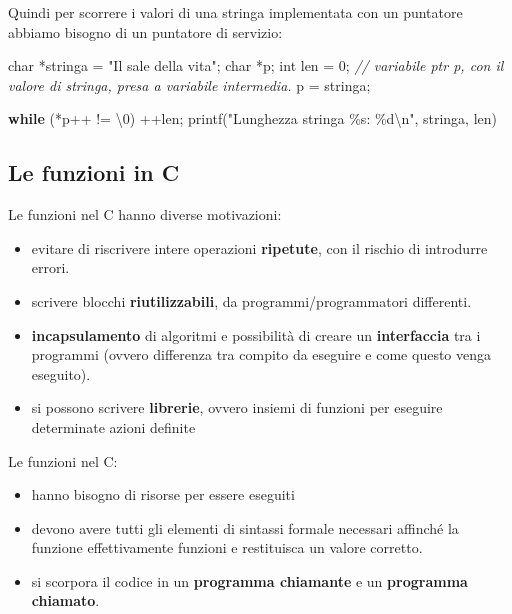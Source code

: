 \documentclass[
]{article}
\newenvironment{Shaded}{}{}
\newcommand{\CharTok}[1]{\textcolor[rgb]{0.25,0.44,0.63}{#1}}
\newcommand{\CommentTok}[1]{\textcolor[rgb]{0.38,0.63,0.69}{\textit{#1}}}
\newcommand{\ControlFlowTok}[1]{\textcolor[rgb]{0.00,0.44,0.13}{\textbf{#1}}}
\newcommand{\DataTypeTok}[1]{\textcolor[rgb]{0.56,0.13,0.00}{#1}}
\newcommand{\DecValTok}[1]{\textcolor[rgb]{0.25,0.63,0.44}{#1}}
\newcommand{\NormalTok}[1]{#1}
\newcommand{\SpecialCharTok}[1]{\textcolor[rgb]{0.25,0.44,0.63}{#1}}
\newcommand{\StringTok}[1]{\textcolor[rgb]{0.25,0.44,0.63}{#1}}
\begin{document}
Quindi per scorrere i valori di una stringa implementata con un
puntatore abbiamo bisogno di un puntatore di servizio:

\begin{Shaded}
\begin{Highlighting}[]
\DataTypeTok{char}\NormalTok{ *stringa = }\StringTok{"Il sale della vita"}\NormalTok{;}
\DataTypeTok{char}\NormalTok{ *p;}
\DataTypeTok{int}\NormalTok{ len = }\DecValTok{0}\NormalTok{;}
\CommentTok{// variabile ptr p, con il valore di stringa, presa a variabile intermedia.}
\NormalTok{p = stringa;}

\ControlFlowTok{while}\NormalTok{ (*p++ != }\CharTok{\textquotesingle{}\textbackslash{}0\textquotesingle{}}\NormalTok{)}
\NormalTok{	++len;}
\NormalTok{printf(}\StringTok{"Lunghezza stringa \%s: \%d}\SpecialCharTok{\textbackslash{}n}\StringTok{"}\NormalTok{, stringa, len)}
\end{Highlighting}
\end{Shaded}

\hypertarget{header-n733}{%
\subsection{Le funzioni in C}\label{header-n733}}

Le funzioni nel C hanno diverse motivazioni:

\begin{itemize}
\item
  evitare di riscrivere intere operazioni \textbf{ripetute}, con il
  rischio di introdurre errori.
\item
  scrivere blocchi \textbf{riutilizzabili}, da programmi/programmatori
  differenti.
\item
  \textbf{incapsulamento} di algoritmi e possibilità di creare un
  \textbf{interfaccia} tra i programmi (ovvero differenza tra compito da
  eseguire e come questo venga eseguito).
\item
  si possono scrivere \textbf{librerie}, ovvero insiemi di funzioni per
  eseguire determinate azioni definite
\end{itemize}

Le funzioni nel C:

\begin{itemize}
\item
  hanno bisogno di risorse per essere eseguiti
\item
  devono avere tutti gli elementi di sintassi formale necessari affinché
  la funzione effettivamente funzioni e restituisca un valore corretto.
\item
  si scorpora il codice in un \textbf{programma chiamante} e un
  \textbf{programma chiamato}.
\end{itemize}
\end{document}
